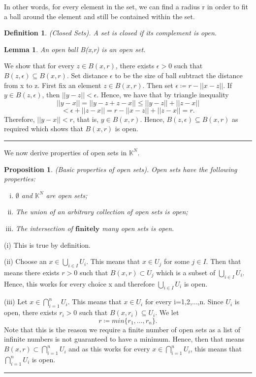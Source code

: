 \documentclass[twoside]{article}
\newtheorem{lemma}[theorem]{Lemma}
\newtheorem{proposition}[theorem]{Proposition}
\newtheorem{definition}[theorem]{Definition}
\newenvironment{proof}{{\bf Proof:}}{\hfill\rule{2mm}{2mm}}
\begin{document}
In other words, for every element in the set, we can find a radius r in order to fit a ball around the element and still be contained within the set.

\begin{definition}(Closed Sets). A set is closed if its complement is open.
\end{definition}

\begin{lemma}An open ball B(x,r) is an open set.
\end{lemma}
\begin{proof}
We show that for every $z \in B(x,r)$, there exists $\epsilon>0$ such that $B(z,\epsilon) \subseteq B(x,r)$. Set distance $\epsilon$ to be the size of ball subtract the distance from x to z. First fix an element $z \in B(x,r)$. Then set $\epsilon \coloneqq r - ||x-z||$. If $y \in B(z,\epsilon)$, then $||y-z|| < \epsilon$. Hence, we have that by triangle inequality
$$
||y-x|| = ||y-z+z-x|| \leq ||y-z|| + ||z-x||
$$
$$
< \epsilon + ||z-x|| = r - ||x-z|| + ||z-x|| = r.
$$
Therefore, $||y-x|| < r$, that is, $y \in B(x,r)$. Hence, $B(z,\epsilon) \subseteq B(x,r)$ as required which shows that $B(x,r)$ is open.
\end{proof}

We now derive properties of open sets in $\mathbb{K}^N$.

\begin{proposition}(Basic properties of open sets). Open sets have the following properties:
\begin{enumerate}[(i)]
  \item $\emptyset$ and $\mathbb{K}^N$ are open sets;
  \item The union of an arbitrary collection of open sets is open;
  \item The intersection of $\textbf{finitely}$ many open sets is open.
\end{enumerate}
\end{proposition}

\begin{proof}
(i) This is true by definition. 

(ii) Choose an $x \in \bigcup_{i \in I}U_i$. This means that $x \in U_j$ for some $j \in I$. Then that means there exists $r > 0$ such that $B(x,r) \subset U_j$ which is a subset of $\bigcup_{i \in I}U_i$. Hence, this works for every choice x and therefore $\bigcup_{i \in I}U_i$ is open.

(iii) Let $x \in \bigcap_{i=1}^nU_i$. This means that $x \in U_i$ for every i=1,2,...,n. Since $U_i$ is open, there exists $r_i > 0$ such that $B(x,r_i) \subseteq U_i$. We let 
$$
r \coloneqq min\{r_1,...,r_n\}.
$$
Note that this is the reason we require a finite number of open sets as a list of infinite numbers is not guaranteed to have a minimum. Hence, then that means $B(x,r) \subset \bigcap_{i=1}^nU_i$ and as this works for every $x \in \bigcap_{i=1}^nU_i$, this means that $\bigcap_{i=1}^nU_i$ is open.
\end{proof}
\end{document}
